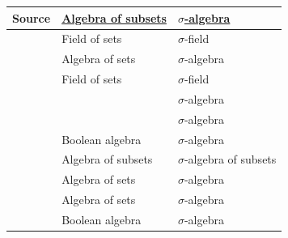\begin{remark}
  \begin{table}
    \centering
    \begin{tabular}{l l l}
      \toprule
      Source                                                                 & \hyperref[def:algebra_of_subsets]{Algebra of subsets} & \hyperref[def:sigma_algebra]{\( \sigma \)-algebra} \\
      \midrule
      \cite[12]{Birkhoff1967LatticeTheory}                                   & Field of sets                                         & \( \sigma \)-field                                 \\
      \cite[21; 28]{Halmos1976MeasureTheory}                                 & Algebra of sets                                       & \( \sigma \)-algebra                               \\
      \cite[24; 268]{HalmosGivant2009BooleanAlgebras}                        & Field of sets                                         & \( \sigma \)-field                                 \\
      \cite[112]{Feller1971ProbabilityTheoryVol2}                            &                                                       & \( \sigma \)-algebra                               \\
      \cite[def. 1.3]{Rudin1987RealAndComplexAnalysis}                       &                                                       & \( \sigma \)-algebra                               \\
      \cite[2]{Malliavin1995IntegrationAndProbability}                       & Boolean algebra                                       & \( \sigma \)-algebra                               \\
      \cite[\S 5.25]{Schechter1997AnalysisHandbook}                          & Algebra of subsets                                    & \( \sigma \)-algebra of subsets                    \\
      \cite[21]{Folland1999RealAnalysis}                                     & Algebra of sets                                       & \( \sigma \)-algebra                               \\
      \cite[def. I.4.9]{Jech2006SetTheory}                                   & Algebra of sets                                       & \( \sigma \)-algebra                               \\
      \cite[def. 1.4.1; def. 1.4.12]{Tao2011MeasureTheory}                   & Boolean algebra                                       & \( \sigma \)-algebra                               \\

\end{tabular}
\end{table}
\end{remark}
